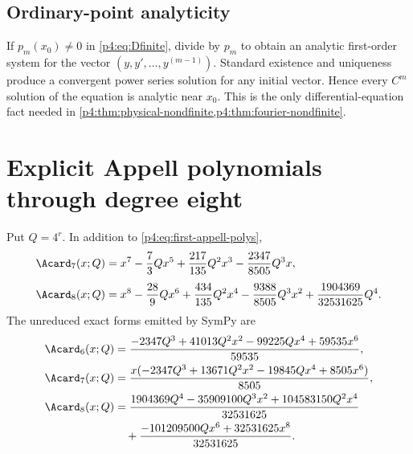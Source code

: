 \documentclass[11pt]{article}
\numberwithin{equation}{section}
\theoremstyle{definition}
\theoremstyle{remark}
\begin{document}
\subsection{Ordinary-point analyticity}
If $p_m(x_0)\ne0$ in \eqref{p4:eq:Dfinite}, divide by $p_m$ to obtain an analytic first-order system for the vector
$(y,y',\ldots,y^{(m-1)})$.  Standard existence and uniqueness produce a convergent power series solution for any initial vector.  Hence every $C^m$ solution of the equation is analytic near $x_0$.  This is the only differential-equation fact needed in \cref{p4:thm:physical-nondfinite,p4:thm:fourier-nondfinite}.

\section{Explicit Appell polynomials through degree eight}
\label{p4:app:polynomials}
Put $Q=4^r$.  In addition to \eqref{p4:eq:first-appell-polys},
\begin{align*}
 \Acard_7(x;Q)
 &=x^7-\frac73Qx^5+\frac{217}{135}Q^2x^3
   -\frac{2347}{8505}Q^3x,\\[0.4em]
 \Acard_8(x;Q)
 &=x^8-\frac{28}{9}Qx^6+\frac{434}{135}Q^2x^4
   -\frac{9388}{8505}Q^3x^2
   +\frac{1904369}{32531625}Q^4.
\end{align*}
The unreduced exact forms emitted by SymPy are
\begin{align*}
 \Acard_6(x;Q)
 &=\frac{-2347Q^3+41013Q^2x^2-99225Qx^4+59535x^6}{59535},\\
 \Acard_7(x;Q)
 &=\frac{x(-2347Q^3+13671Q^2x^2-19845Qx^4+8505x^6)}{8505},\\
 \Acard_8(x;Q)
 &=\frac{1904369Q^4-35909100Q^3x^2+104583150Q^2x^4}{32531625}\\
 &\quad+\frac{-101209500Qx^6+32531625x^8}{32531625}.
\end{align*}
\end{document}
